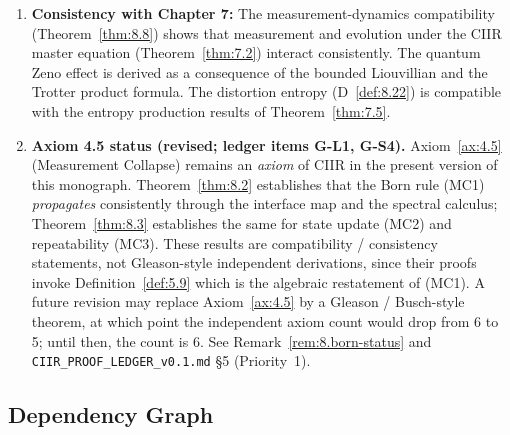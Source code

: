 \begin{enumerate}
  \item \textbf{Consistency with Chapter 7:}
    The measurement-dynamics compatibility
    (Theorem~\ref{thm:8.8}) shows that measurement and evolution
    under the CIIR master equation
    (Theorem~\ref{thm:7.2}) interact consistently.  The quantum Zeno
    effect is derived as a consequence of the bounded Liouvillian
    and the Trotter product formula.  The distortion entropy
    (D~\ref{def:8.22}) is compatible with the entropy production
    results of Theorem~\ref{thm:7.5}.

  \item \textbf{Axiom 4.5 status (revised; ledger items G-L1, G-S4).}
    Axiom~\ref{ax:4.5} (Measurement Collapse) remains an
    \emph{axiom} of CIIR in the present version of this monograph.
    Theorem~\ref{thm:8.2} establishes that the Born rule (MC1)
    \emph{propagates} consistently through the interface map and the
    spectral calculus; Theorem~\ref{thm:8.3} establishes the same for
    state update (MC2) and repeatability (MC3).  These results are
    compatibility / consistency statements, not Gleason-style
    independent derivations, since their proofs invoke
    Definition~\ref{def:5.9} which is the algebraic restatement of
    (MC1).  A future revision may replace Axiom~\ref{ax:4.5} by a
    Gleason / Busch-style theorem, at which point the independent
    axiom count would drop from 6 to 5; until then, the count is 6.
    See Remark~\ref{rem:8.born-status} and
    \texttt{CIIR\_PROOF\_LEDGER\_v0.1.md} \S{}5 (Priority~1).
\end{enumerate}

\subsection{Dependency Graph}
\label{sec:ch8:depgraph}

